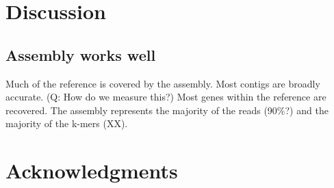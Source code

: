 
\section*{Discussion}
 

\subsection*{Assembly works well} 
Much of the reference is covered by the assembly.
Most contigs are broadly accurate. (Q: How do we measure this?)
Most genes within the reference are recovered.
The assembly represents the majority of the reads (90\%?) and the majority of the k-mers (XX).

 
\section*{Acknowledgments}



%
%
% 





